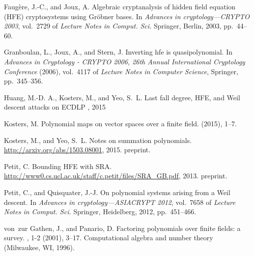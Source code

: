 \documentclass{amsart}
\theoremstyle{plain}
\theoremstyle{definition}
\begin{document}
\begin{thebibliography}{10}
{\sc Faug{\`e}re, J.-C., and Joux, A.}
\newblock Algebraic cryptanalysis of hidden field equation ({HFE})
  cryptosystems using {G}r\"obner bases.
\newblock In {\em Advances in cryptology---{CRYPTO} 2003}, vol.~2729 of {\em
  Lecture Notes in Comput. Sci.} Springer, Berlin, 2003, pp.~44--60.

{\sc Granboulan, L., Joux, A., and Stern, J.}
\newblock Inverting hfe is quasipolynomial.
\newblock In {\em Advances in Cryptology - CRYPTO 2006, 26th Annual
  International Cryptology Conference\/} (2006), vol.~4117 of {\em Lecture
  Notes in Computer Science}, Springer, pp.~345--356.

{\sc Huang, M.-D. A., Kosters, M., and Yeo, S.~L.}
\newblock Last fall degree, HFE, and Weil descent attacks on ECDLP
, 2015

{\sc Kosters, M.}
\newblock Polynomial maps on vector spaces over a finite field.
 (2015), 1--7.

{\sc Kosters, M., and Yeo, S.~L.}
\newblock Notes on summation polynomials.
\newblock \url{http://arxiv.org/abs/1503.08001}, 2015.
\newblock preprint.

{\sc Petit, C.}
\newblock Bounding HFE with SRA.
\newblock \url{http://www0.cs.ucl.ac.uk/staff/c.petit/files/SRA_GB.pdf}, 2013.
\newblock preprint.

{\sc Petit, C., and Quisquater, J.-J.}
\newblock On polynomial systems arising from a {W}eil descent.
\newblock In {\em Advances in cryptology---{ASIACRYPT} 2012}, vol.~7658 of {\em
  Lecture Notes in Comput. Sci.} Springer, Heidelberg, 2012, pp.~451--466.

{\sc von~zur Gathen, J., and Panario, D.}
\newblock Factoring polynomials over finite fields: a survey.
, 1-2 (2001), 3--17.
\newblock Computational algebra and number theory (Milwaukee, WI, 1996).

\end{thebibliography}
\end{document}
